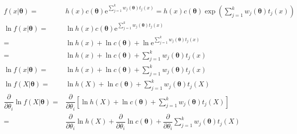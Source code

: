 \documentclass[
]{book}
\theoremstyle{definition}
\theoremstyle{definition}
\theoremstyle{definition}
\theoremstyle{definition}
\theoremstyle{remark}
\begin{document}
\[
\begin{aligned}
f\left(x|\boldsymbol{\theta}\right)= & h\left(x\right)c\left(\boldsymbol{\theta}\right)\mathrm{e}^{{\scriptscriptstyle \sum\limits _{j=1}^{k}w_{{\scriptscriptstyle j}}\left(\boldsymbol{\theta}\right)t_{{\scriptscriptstyle j}}\left(x\right)}}=h\left(x\right)c\left(\boldsymbol{\theta}\right)\exp\left(\sum\limits _{j=1}^{k}w_{{\scriptscriptstyle j}}\left(\boldsymbol{\theta}\right)t_{{\scriptscriptstyle j}}\left(x\right)\right)\\
\ln f\left(x|\boldsymbol{\theta}\right)= & \ln h\left(x\right)c\left(\boldsymbol{\theta}\right)\mathrm{e}^{{\scriptscriptstyle \sum\limits _{j=1}^{k}w_{{\scriptscriptstyle j}}\left(\boldsymbol{\theta}\right)t_{{\scriptscriptstyle j}}\left(x\right)}}\\
= & \ln h\left(x\right)+\ln c\left(\boldsymbol{\theta}\right)+\ln\mathrm{e}^{{\scriptscriptstyle \sum\limits _{j=1}^{k}w_{{\scriptscriptstyle j}}\left(\boldsymbol{\theta}\right)t_{{\scriptscriptstyle j}}\left(x\right)}}\\
= & \ln h\left(x\right)+\ln c\left(\boldsymbol{\theta}\right)+\sum\limits _{j=1}^{k}w_{{\scriptscriptstyle j}}\left(\boldsymbol{\theta}\right)t_{{\scriptscriptstyle j}}\left(x\right)\\
\ln f\left(x|\boldsymbol{\theta}\right)= & \ln h\left(x\right)+\ln c\left(\boldsymbol{\theta}\right)+\sum\limits _{j=1}^{k}w_{{\scriptscriptstyle j}}\left(\boldsymbol{\theta}\right)t_{{\scriptscriptstyle j}}\left(x\right)\\
\ln f\left(X|\boldsymbol{\theta}\right)= & \ln h\left(X\right)+\ln c\left(\boldsymbol{\theta}\right)+\sum\limits _{j=1}^{k}w_{{\scriptscriptstyle j}}\left(\boldsymbol{\theta}\right)t_{{\scriptscriptstyle j}}\left(X\right)\\
\dfrac{\partial}{\partial\theta_{{\scriptscriptstyle i}}}\ln f\left(X|\boldsymbol{\theta}\right)= & \dfrac{\partial}{\partial\theta_{{\scriptscriptstyle i}}}\left[\ln h\left(X\right)+\ln c\left(\boldsymbol{\theta}\right)+\sum\limits _{j=1}^{k}w_{{\scriptscriptstyle j}}\left(\boldsymbol{\theta}\right)t_{{\scriptscriptstyle j}}\left(X\right)\right]\\
= & \dfrac{\partial}{\partial\theta_{{\scriptscriptstyle i}}}\ln h\left(X\right)+\dfrac{\partial}{\partial\theta_{{\scriptscriptstyle i}}}\ln c\left(\boldsymbol{\theta}\right)+\dfrac{\partial}{\partial\theta_{{\scriptscriptstyle i}}}\sum\limits _{j=1}^{k}w_{{\scriptscriptstyle j}}\left(\boldsymbol{\theta}\right)t_{{\scriptscriptstyle j}}\left(X\right)\\

\end{aligned}\]
\end{document}

